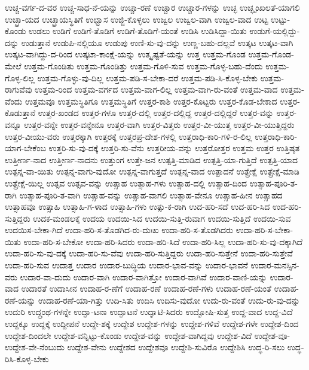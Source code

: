 {ಉಚ್ಚ-ವರ್ಗ-ದ-ವರ
ಉಚ್ಚ-ಸಾಧ-ನೆ-ಯನ್ನು
ಉಚ್ಚಾ-ರಣೆ
ಉಚ್ಚಾರ
ಉಚ್ಚಾರ-ಗಳನ್ನು
ಉಚ್ಛ
ಉಚ್ಛೃಂಖಲತೆ-ಯಾಗಲಿ
ಉಚ್ಛ್ರಾ-ಯದ
ಉಚ್ಛ್ರಾಯಸ್ಥಿತಿಗೆ
ಉಛ್ವಾಸ
ಉಜ್ಜಿ-ಕೊಳ್ಳಲು
ಉಜ್ವಲ
ಉಜ್ವಲ-ವಾಗಿ
ಉಜ್ವಲ-ವಾದ
ಉಟ್ಟ
ಉಟ್ಟು-ಕೊಂಡು
ಉಡಲು
ಉಡಿಗೆ
ಉಡಿಗೆ-ತೊಡಿಗೆ
ಉಡಿಗೆ-ತೊಡಿಗೆ-ಯಂತೆ
ಉಡಿಸಿ
ಉಡಿಸಿದ್ದಾ-ಯಿತು
ಉಡುಗೆ-ಯಲ್ಲಿದ್ದು-ದನ್ನು
ಉಡುತ್ತಾನೆ
ಉಡುಪಿ-ನಲ್ಲಿಯೂ
ಉಡುಪು
ಉಣಿ-ಸು-ವು-ದನ್ನು
ಉಣ್ಣ-ಬಹು-ದಲ್ಲವೆ
ಉತ್ಕಟ
ಉತ್ಕಟ-ವಾಗಿ
ಉತ್ಕಟ-ವಾಗಿದ್ದು-ದ-ರಿಂದ
ಉತ್ಕಟಾ-ಕಾಂಕ್ಷೆ-ಯನ್ನು
ಉತ್ಕೃಷ್ಟತೆ-ಯನ್ನು
ಉತ್ತ
ಉತ್ತಮ-ಗೊಂಡ
ಉತ್ತಮ-ಗೊಂಡ-ಮೇಲೆ
ಉತ್ತಮ-ಗೊಂಡಿತು
ಉತ್ತಮ-ಗೊಂಡಿತ್ತು
ಉತ್ತಮ-ಗೊಳಿ-ಸುವ
ಉತ್ತಮ-ಗೊಳ್ಳ-ಬಹು-ದೆಂದು
ಉತ್ತಮ-ಗೊಳ್ಳ-ಲಿಲ್ಲ
ಉತ್ತಮ-ಗೊಳ್ಳು-ವು-ದಿಲ್ಲ
ಉತ್ತಮ-ಪಡಿ-ಸ-ಬೇಕಾ-ದರೆ
ಉತ್ತಮ-ಪಡಿ-ಸಿ-ಕೊಳ್ಳ-ಬೇಕು
ಉತ್ತಮ-ರಾಗುವೆವು
ಉತ್ತಮ-ರಿಂದ
ಉತ್ತಮ-ವರ್ಗದ
ಉತ್ತಮ-ವಾಗ-ಲಿಲ್ಲ
ಉತ್ತಮ-ವಾಗಿ-ರು-ವಂತೆ
ಉತ್ತಮ-ವಾದ
ಉತ್ತಮ-ವೆಂದು
ಉತ್ತಮವೂ
ಉತ್ತಮಸ್ಥಿತಿಗೂ
ಉತ್ತಮಸ್ಥಿತಿಗೆ
ಉತ್ತರ-ಕಾಶಿ
ಉತ್ತರ-ಕೊಟ್ಟರು
ಉತ್ತರ-ಕೊಡ-ಬೇಕಾದ
ಉತ್ತರ-ಕೊಡುತ್ತಾನೆ
ಉತ್ತರ-ಖಂಡದ
ಉತ್ತರ-ಗಳೂ
ಉತ್ತರ-ದಲ್ಲಿ
ಉತ್ತರ-ದಲ್ಲಿದ್ದ
ಉತ್ತರ-ದಲ್ಲಿದ್ದರೆ
ಉತ್ತರ-ವನ್ನು
ಉತ್ತರ-ವನ್ನೂ
ಉತ್ತರ-ವನ್ನೇ
ಉತ್ತರ-ವನ್ನೇನೂ
ಉತ್ತರ-ವಾಗಿ
ಉತ್ತರ-ವಿತ್ತರು
ಉತ್ತರ-ವೀ-ಯುತ್ತ
ಉತ್ತರ-ವೀ-ಯುತ್ತಿದ್ದರು
ಉತ್ತರ-ವೀಯು-ವರು
ಉತ್ತರಕ್ಕಾಗಿ
ಉತ್ತರಕ್ಕೆ
ಉತ್ತರಪ್ರ-ದೇಶ-ಗಳಲ್ಲಿ
ಉತ್ತರಾಧಿ-ಕಾರಿ-ಗಳಿ-ರ-ಲಿಲ್ಲ
ಉತ್ತರಾಧಿ-ಕಾರಿ-ಯಾಗ-ಬೇಕೆಂಬ
ಉತ್ತರಿ-ಸು-ವು-ದಕ್ಕೆ
ಉತ್ತರಿ-ಸು-ವೆನು
ಉತ್ತರೀಯ-ವನ್ನು
ಉತ್ತರೋತ್ತರ
ಉತ್ತಮ
ಉತ್ತರ
ಉತ್ತಿಷ್ಠತ
ಉತ್ತೀರ್ಣ-ನಾದ
ಉತ್ತೀರ್ಣ-ನಾದನು
ಉತ್ತುಂಗ
ಉತ್ತೇ-ಜನ
ಉತ್ಪತ್ತಿ-ಮಾಡಿದ
ಉತ್ಪತ್ತಿ-ಯಾ-ಗುತ್ತಿದೆ
ಉತ್ಪತ್ತಿ-ಯಾದ
ಉತ್ಪನ್ನ-ವಾ-ಯಿತು
ಉತ್ಪನ್ನ-ವಾಗು-ವುದೋ
ಉತ್ಪನ್ನ-ವಾಗುತ್ತದೆ
ಉತ್ಪನ್ನ-ವಾದ
ಉತ್ಪಾದನೆ
ಉತ್ಪ್ರೇಕ್ಷೆ
ಉತ್ಪ್ರೇಕ್ಷೆ-ಮಾಡಿ
ಉತ್ಪ್ರೇಕ್ಷೆ-ಯಿಲ್ಲ
ಉತ್ಸವ
ಉತ್ಸವ-ವನ್ನು
ಉತ್ಸಾಹ
ಉತ್ಸಾಹ-ಗಳು
ಉತ್ಸಾಹ-ದಲ್ಲಿ
ಉತ್ಸಾಹ-ದಿಂದ
ಉತ್ಸಾಹ-ಪೂರಿ-ತ-ರಾಗಿ
ಉತ್ಸಾಹ-ಪೂರಿ-ತ-ವಾಗಿ
ಉತ್ಸಾಹ-ವನ್ನು
ಉತ್ಸಾಹ-ವಾಗಲಿ
ಉತ್ಸಾಹ-ವೇನೂ
ಉತ್ಸಾಹ-ಹೀನ
ಉತ್ಸಾಹದ
ಉತ್ಸಾಹವೂ
ಉತ್ಸಾಹಿ
ಉತ್ಸಾಹಿ-ಗ-ಳಾದ
ಉತ್ಸಾಹಿ-ಗಳು
ಉತ್ಸು-ಕ-ರಾಗಿ
ಉದ-ಹರಿ-ಸದೆ
ಉದ-ಹರಿ-ಸಿದ
ಉದ-ಹರಿ-ಸುತ್ತಿದ್ದರು
ಉದಕ-ಮಂಡಲಕ್ಕೆ
ಉದಯ
ಉದಯಿ-ಸಿದ
ಉದಯಿ-ಸುತ್ತಿ-ರುವಾಗ
ಉದಯಿ-ಸುತ್ತಿದೆ
ಉದಯಿ-ಸುವ
ಉದಯಿಸ-ಬೇಕಾ-ಗಿದೆ
ಉದಾ-ಹರಿ-ಸ-ತೊಡಗಿದ-ರು-ದುಃಖ
ಉದಾ-ಹರಿ-ಸ-ತೊಡಗಿದರು
ಉದಾ-ಹರಿ-ಸ-ಬೇಕಾ-ಯಿತು
ಉದಾ-ಹರಿ-ಸ-ಬೇಕೋ
ಉದಾ-ಹರಿ-ಸಿದರು
ಉದಾ-ಹರಿ-ಸಿದೆ
ಉದಾ-ಹರಿ-ಸಿಲ್ಲ
ಉದಾ-ಹರಿ-ಸು-ವು-ದಕ್ಕಾಗಿದೆ
ಉದಾ-ಹರಿ-ಸು-ವು-ದಕ್ಕೆ
ಉದಾ-ಹರಿ-ಸು-ವೆವು
ಉದಾ-ಹರಿ-ಸುತ್ತಿದ್ದರು
ಉದಾ-ಹರಿ-ಸುತ್ತೇನೆ
ಉದಾ-ಹರಿ-ಸುತ್ತೇವೆ
ಉದಾ-ಹರಿ-ಸುವ
ಉದಾತ್ತ
ಉದಾರ
ಉದಾರ-ಬುದ್ಧಿಯ
ಉದಾರ-ಭಾವ-ವನ್ನು
ಉದಾರ-ಭಾವನೆ
ಉದಾರ-ಮನಸ್ಸಿನ-ವರು
ಉದಾರ-ವಾ-ದುದು
ಉದಾರ-ವಾಗಿ
ಉದಾರ-ವಾಗಿತ್ತೋ
ಉದಾರ-ವಾಗಿವೆ
ಉದಾರ-ವಾಣಿ-ಯನ್ನು
ಉದಾರ-ವಾದ
ಉದಾರತೆ
ಉದಾಸೀನ
ಉದಾಹ-ರ-ಣೆಗೆ
ಉದಾಹ-ರಣೆ
ಉದಾಹ-ರಣೆ-ಗಳು
ಉದಾಹ-ರಣೆ-ಯಂತೆ
ಉದಾಹ-ರಣೆ-ಯನ್ನು
ಉದಾಹ-ರಣೆ-ಯಾ-ಗಿತ್ತು
ಉದಿ-ಸಿತು
ಉದಿಸಿ
ಉದಿಸು-ವುದೋ
ಉದು-ರು-ವಂತೆ
ಉದು-ರು-ವು-ದನ್ನು
ಉದುರಿ
ಉದ್ಗ್ರಂಥ-ಗಳನ್ನೇ
ಉದ್ಘಾ-ಟನಾ
ಉದ್ಘಾಟನೆ
ಉದ್ಘಾಟಿ-ಸಿದರು
ಉದ್ಘೋಷಿ-ಸುತ್ತ
ಉದ್ದ-ವಾದ
ಉದ್ದ-ವಿದೆ
ಉದ್ದಕ್ಕೂ
ಉದ್ದಕ್ಕೆ
ಉದ್ದೀಪನೆ
ಉದ್ದೇ-ಶಕ್ಕೆ
ಉದ್ದೇಶ
ಉದ್ದೇಶ-ಗಳನ್ನು
ಉದ್ದೇಶ-ಗಳಿವೆ
ಉದ್ದೇಶ-ಗಳೇ
ಉದ್ದೇಶ-ದಿಂದ
ಉದ್ದೇಶ-ದಿಂದಲೇ
ಉದ್ದೇಶ-ವನ್ನಿಟ್ಟು-ಕೊಂಡು
ಉದ್ದೇಶ-ವನ್ನು
ಉದ್ದೇಶ-ವಾಗಿದ್ದವು
ಉದ್ದೇಶ-ವಿದೆ
ಉದ್ದೇಶ-ವೂ-
ಉದ್ದೇಶ-ವೇ-ನೆಂಬುದು
ಉದ್ದೇಶ-ವೇನು
ಉದ್ದೇಶದ
ಉದ್ದೇಶವೂ
ಉದ್ದೇಶಿ-ಸುವಿರೊ
ಉದ್ದೇಶಿಸಿ
ಉದ್ಧ-ರಿ-ಸಲು
ಉದ್ಧ-ರಿಸಿ-ಕೊಳ್ಳ-ಬೇಕು
}
